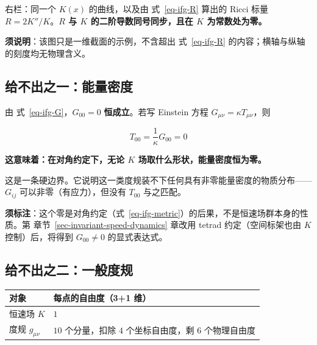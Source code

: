 \documentclass[
  chinese,
  a4paper,
  UTF8,
  12pt,
  oneside,
  openany]{ctexbook}
\newcounter{none} %
\theoremstyle{plain}
\theoremstyle{plain}
\theoremstyle{plain}
\theoremstyle{definition}
\theoremstyle{plain}
\theoremstyle{plain}
\theoremstyle{remark}
\begin{document}
右栏：同一个 \(K(x)\) 的曲线，以及由 式~\ref{eq-ifg-R} 算出的 Ricci 标量
\(R=2K''/K\)。\textbf{\(R\) 与 \(K\) 的二阶导数同号同步，且在 \(K\)
为常数处为零。}

\textbf{须说明}：该图只是一维截面的示例，不含超出 式~\ref{eq-ifg-R}
的内容；横轴与纵轴的刻度均无物理含义。

\subsection{给不出之一：能量密度}\label{ux7ed9ux4e0dux51faux4e4bux4e00ux80fdux91cfux5bc6ux5ea6}

由 式~\ref{eq-ifg-G}，\(G_{00}=0\) \textbf{恒成立}。若写 Einstein 方程
\(G_{\mu\nu}=\kappa T_{\mu\nu}\)，则

\[
T_{00}=\frac{1}{\kappa}G_{00}=0
\]

\textbf{这意味着：在对角约定下，无论 \(K\)
场取什么形状，能量密度恒为零。}

这是一条硬边界。它说明这一类度规装不下任何具有非零能量密度的物质分布------\(G_{ij}\)
可以非零（有应力），但没有 \(T_{00}\) 与之匹配。

\textbf{须标注}：这个零是对角约定（式~\ref{eq-ifg-metric}）的后果，不是恒速场群本身的性质。第
章节~\ref{sec-invariant-speed-dynamics} 章改用 tetrad 约定（空间标架也由
\(K\) 控制）后，将得到 \(G_{00}\neq0\) 的显式表达式。

\subsection{给不出之二：一般度规}\label{ux7ed9ux4e0dux51faux4e4bux4e8cux4e00ux822cux5ea6ux89c4}

{\def\LTcaptype{none} %
\begin{longtable}[]{@{}
  >{\raggedright\arraybackslash}p{}
  >{\raggedright\arraybackslash}p{}@{}}
\toprule\noalign{}
\begin{minipage}[b]{\linewidth}\raggedright
对象
\end{minipage} & \begin{minipage}[b]{\linewidth}\raggedright
每点的自由度（3+1 维）
\end{minipage} \\
\midrule\noalign{}
\endhead
\bottomrule\noalign{}
\endlastfoot
恒速场 \(K\) & \(1\) \\
度规 \(g_{\mu\nu}\) & \(10\) 个分量，扣除 \(4\) 个坐标自由度，剩 \(6\)
个物理自由度 \\
\end{longtable}
}
\end{document}
